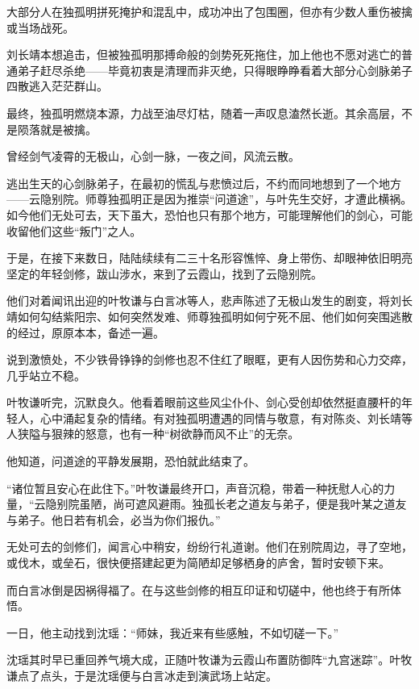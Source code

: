 大部分人在独孤明拼死掩护和混乱中，成功冲出了包围圈，但亦有少数人重伤被擒或当场战死。

刘长靖本想追击，但被独孤明那搏命般的剑势死死拖住，加上他也不愿对逃亡的普通弟子赶尽杀绝——毕竟初衷是清理而非灭绝，只得眼睁睁看着大部分心剑脉弟子四散逃入茫茫群山。

最终，独孤明燃烧本源，力战至油尽灯枯，随着一声叹息溘然长逝。其余高层，不是陨落就是被擒。

曾经剑气凌霄的无极山，心剑一脉，一夜之间，风流云散。

\vspace{2em}

逃出生天的心剑脉弟子，在最初的慌乱与悲愤过后，不约而同地想到了一个地方——云隐别院。师尊独孤明正是因为推崇“问道途”，与叶先生交好，才遭此横祸。如今他们无处可去，天下虽大，恐怕也只有那个地方，可能理解他们的剑心，可能收留他们这些“叛门”之人。

于是，在接下来数日，陆陆续续有二三十名形容憔悴、身上带伤、却眼神依旧明亮坚定的年轻剑修，跋山涉水，来到了云霞山，找到了云隐别院。

他们对着闻讯出迎的叶牧谦与白言冰等人，悲声陈述了无极山发生的剧变，将刘长靖如何勾结紫阳宗、如何突然发难、师尊独孤明如何宁死不屈、他们如何突围逃散的经过，原原本本，备述一遍。

说到激愤处，不少铁骨铮铮的剑修也忍不住红了眼眶，更有人因伤势和心力交瘁，几乎站立不稳。

叶牧谦听完，沉默良久。他看着眼前这些风尘仆仆、剑心受创却依然挺直腰杆的年轻人，心中涌起复杂的情绪。有对独孤明遭遇的同情与敬意，有对陈炎、刘长靖等人狭隘与狠辣的怒意，也有一种“树欲静而风不止”的无奈。

他知道，问道途的平静发展期，恐怕就此结束了。

“诸位暂且安心在此住下。”叶牧谦最终开口，声音沉稳，带着一种抚慰人心的力量，“云隐别院虽陋，尚可遮风避雨。独孤长老之道友与弟子，便是我叶某之道友与弟子。他日若有机会，必当为你们报仇。”

无处可去的剑修们，闻言心中稍安，纷纷行礼道谢。他们在别院周边，寻了空地，或伐木，或垒石，很快便搭建起更为简陋却足够栖身的庐舍，暂时安顿下来。

\vspace{2em}

而白言冰倒是因祸得福了。在与这些剑修的相互印证和切磋中，他也终于有所体悟。

一日，他主动找到沈瑶：“师妹，我近来有些感触，不如切磋一下。”

沈瑶其时早已重回养气境大成，正随叶牧谦为云霞山布置防御阵“九宫迷踪”。叶牧谦点了点头，于是沈瑶便与白言冰走到演武场上站定。

